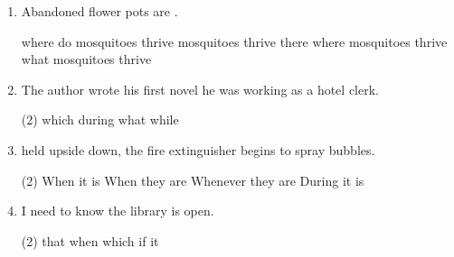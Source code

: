 \begin{enumerate}
\item Abandoned flower pots are \ttu.
\begin{tasks}
  \task where do mosquitoes thrive
  \task mosquitoes thrive there
  \task where mosquitoes thrive
  \task what mosquitoes thrive
\end{tasks}

\item The author wrote his first novel \ttu he was working as a hotel clerk.
\begin{tasks}(2)
  \task which
  \task during
  \task what
  \task while
\end{tasks}

\item \ttu held upside down, the fire extinguisher begins to spray bubbles.
\begin{tasks}(2)
  \task When it is
  \task When they are
  \task Whenever they are
  \task During it is
\end{tasks}

\item I need to know \ttu the library is open.
\begin{tasks}(2)
  \task that
  \task when
  \task which
  \task if it
\end{tasks}

\end{enumerate}

